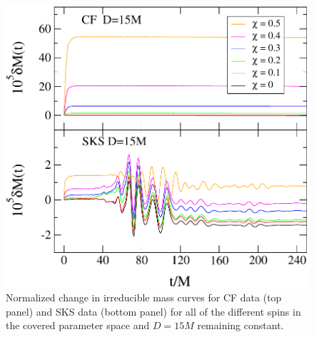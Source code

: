 \begin{figure}[!htb]
 \includegraphics[width=0.95\columnwidth]{chap5/MassIncreaseCFSKS}
  \caption[Normalized change in irreducible mass curves for CF and SKS data.]{Normalized change in irreducible mass curves for CF data (top panel)
    and SKS data (bottom panel) for all of the different spins in the
    covered parameter space and $D=15M$ remaining constant. }
  \label{fig:MassIncreaseCFSKS}
\end{figure}

